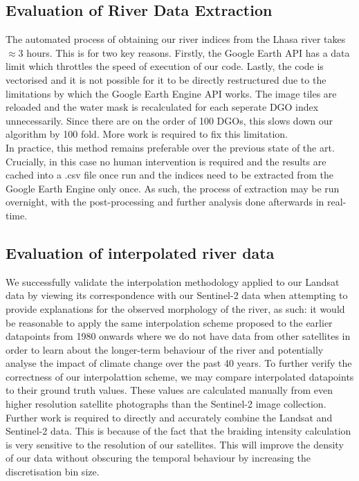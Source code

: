 \documentclass[12pt]{article}
\begin{document}
\subsection{Evaluation of River Data Extraction}
The automated process of obtaining our river indices from the Lhasa river takes $\approx 3$ hours. This is for two key reasons. Firstly, the Google Earth API has a data limit which throttles the speed of execution of our code. Lastly, the code is vectorised and it is not possible for it to be directly restructured due to the limitations by which the Google Earth Engine API works. The image tiles are reloaded and the water mask is recalculated for each seperate DGO index unnecessarily. Since there are on the order of 100 DGOs, this slows down our algorithm by 100 fold. More work is required to fix this limitation. \\

In practice, this method remains preferable over the previous state of the art. Crucially, in this case no human intervention is required and the results are cached into a .csv file once run and the indices need to be extracted from the Google Earth Engine only once. As such, the process of extraction may be run overnight, with the post-processing and further analysis done afterwards in real-time.

\subsection{Evaluation of interpolated river data}
We successfully validate the interpolation methodology applied to our Landsat data by viewing its correspondence with our Sentinel-2 data when attempting to provide explanations for the observed morphology of the river, as such: it would be reasonable to apply the same interpolation scheme proposed to the earlier datapoints from 1980 onwards where we do not have data from other satellites in order to learn about the longer-term behaviour of the river and potentially analyse the impact of climate change over the past 40 years. To further verify the correctness of our interpolattion scheme, we may compare interpolated datapoints to their ground truth values. These values are calculated manually from even higher resolution satellite photographs than the Sentinel-2 image collection. Further work is required to directly and accurately combine the Landsat and Sentinel-2 data. This is because of the fact that the braiding intensity calculation is very sensitive to the resolution of our satellites. This will improve the density of our data without obscuring the temporal behaviour by increasing the discretisation bin size.
\end{document}

